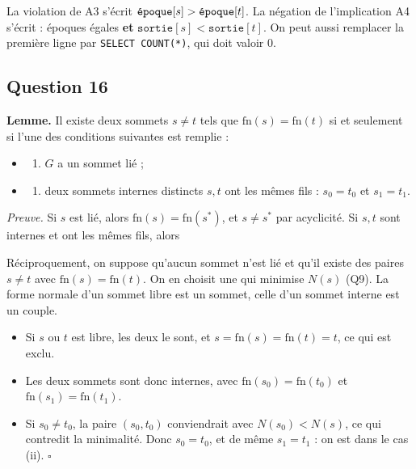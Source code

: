 \documentclass[11pt,a4paper]{article}
\providecommand{\tightlist}{\setlength{\itemsep}{0pt}\setlength{\parskip}{0pt}}
\newcommand{\equationajustee}[1]{%
  \sbox{\boiteequation}{$\displaystyle #1$}%
  \ifdim\wd\boiteequation>\linewidth
    \[\resizebox{\linewidth}{!}{\usebox{\boiteequation}}\]%
  \else
    \[#1\]%
  \fi}
\begin{document}
La violation de A3 s'écrit \(\texttt{\text{époque}}[s]>\texttt{\text{époque}}[t]\). La négation de l'implication A4 s'écrit : époques égales \textbf{et} \(\texttt{sortie}[s]<\texttt{sortie}[t]\). On peut aussi remplacer la première ligne par \texttt{SELECT\ COUNT(*)}, qui doit valoir 0.

\hypertarget{question-16}{%
\subsection{Question 16}\label{question-16}}

\textbf{Lemme.} Il existe deux sommets \(s\neq t\) tels que \(\mathrm{fn}(s)=\mathrm{fn}(t)\) si et seulement si l'une des conditions suivantes est remplie :

\begin{itemize}
\item
  \begin{enumerate}
  \def\labelenumi{(\roman{enumi})}
  \tightlist
  \item
    \(G\) a un sommet lié ;
  \end{enumerate}
\item
  \begin{enumerate}
  \def\labelenumi{(\roman{enumi})}
  \setcounter{enumi}{1}
  \tightlist
  \item
    deux sommets internes distincts \(s,t\) ont les mêmes fils : \(s_0=t_0\) et \(s_1=t_1\).
  \end{enumerate}
\end{itemize}

\emph{Preuve.} Si \(s\) est lié, alors \(\mathrm{fn}(s)=\mathrm{fn}(s^*)\), et \(s\neq s^*\) par acyclicité. Si \(s,t\) sont internes et ont les mêmes fils, alors

\equationajustee{\mathrm{fn}(s)=\big(\mathrm{fn}(s_0),\mathrm{fn}(s_1)\big)=\mathrm{fn}(t).}

Réciproquement, on suppose qu'aucun sommet n'est lié et qu'il existe des paires \(s\neq t\) avec \(\mathrm{fn}(s)=\mathrm{fn}(t)\). On en choisit une qui minimise \(N(s)\) (Q9). La forme normale d'un sommet libre est un sommet, celle d'un sommet interne est un couple.

\begin{itemize}
\tightlist
\item
  Si \(s\) ou \(t\) est libre, les deux le sont, et \(s=\mathrm{fn}(s)=\mathrm{fn}(t)=t\), ce qui est exclu.
\item
  Les deux sommets sont donc internes, avec \(\mathrm{fn}(s_0)=\mathrm{fn}(t_0)\) et \(\mathrm{fn}(s_1)=\mathrm{fn}(t_1)\).
\item
  Si \(s_0\neq t_0\), la paire \((s_0,t_0)\) conviendrait avec \(N(s_0)<N(s)\), ce qui contredit la minimalité. Donc \(s_0=t_0\), et de même \(s_1=t_1\) : on est dans le cas (ii). \(\square\)
\end{itemize}
\end{document}
